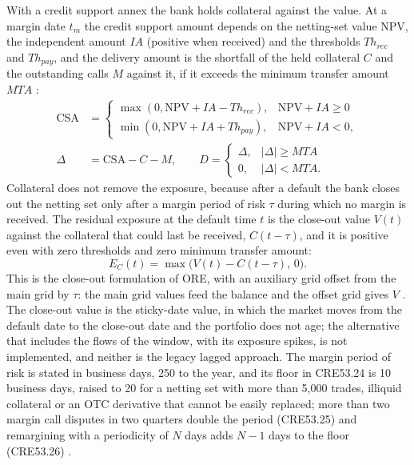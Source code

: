 With a credit support annex the bank holds collateral against the value. At a margin date $t_m$ the credit support amount depends on the netting-set value $\mathrm{NPV}$, the independent amount $IA$ (positive when received) and the thresholds $Th_{rec}$ and $Th_{pay}$, and the delivery amount
is the shortfall of the held collateral $C$ and the outstanding calls $M$ against it, if it exceeds the minimum transfer amount $MTA$ \citep{ccr:ore}:
\begin{equation}
\begin{aligned}
\mathrm{CSA}&=\begin{cases}\max(0,\mathrm{NPV}+IA-Th_{rec}), & \mathrm{NPV}+IA\ge0\\ \min(0,\mathrm{NPV}+IA+Th_{pay}), & \mathrm{NPV}+IA<0,\end{cases}\\
\Delta&=\mathrm{CSA}-C-M,\qquad D=\begin{cases}\Delta,&|\Delta|\ge MTA\\0,&|\Delta|<MTA.\end{cases}
\end{aligned}
\label{eq:ccr-csa}
\end{equation}
Collateral does not remove the exposure, because after a default the bank closes out the netting set only after a margin period of risk $\tau$ during which no margin is received. The residual exposure at the default time $t$ is the close-out value $V(t)$ against the collateral that could last be received,
$C(t-\tau)$, and it is positive even with zero thresholds and zero minimum transfer amount:
\begin{equation}
E_C(t)=\max\big(V(t)-C(t-\tau),\,0\big).
\label{eq:ccr-resid}
\end{equation}
This is the close-out formulation of ORE, with an auxiliary grid offset from the main grid by $\tau$: the main grid values feed the balance and the offset grid gives $V$ \citep{ccr:ore,ccr:hullwhite2012}. The close-out value is the sticky-date value, in which the market moves from the default date to the close-out date and the portfolio does not age; the alternative
that includes the flows of the window, with its exposure spikes, is not implemented, and neither is the legacy lagged approach. The margin period of risk is stated in business days, 250 to the year, and its floor in CRE53.24 is 10 business days, raised to 20 for a netting set with more than 5,000 trades, illiquid collateral or an OTC derivative that
cannot be easily replaced; more than two margin call disputes in two quarters double the period (CRE53.25) and remargining with a periodicity of $N$ days adds $N-1$ days to the floor (CRE53.26) \citep{ccr:cre53}.

